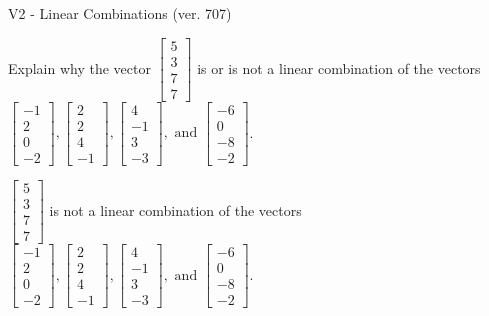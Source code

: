 \begin{exercise}
  \begin{exerciseTitle}V2 - Linear Combinations (ver. 707)\end{exerciseTitle}
  \begin{exerciseStatement}
    Explain why the vector \(\left[\begin{array}{c}
5 \\
3 \\
7 \\
7
\end{array}\right]\)  is or is not a linear 
	combination of the vectors \(\left[\begin{array}{c}
-1 \\
2 \\
0 \\
-2
\end{array}\right] , \left[\begin{array}{c}
2 \\
2 \\
4 \\
-1
\end{array}\right] , \left[\begin{array}{c}
4 \\
-1 \\
3 \\
-3
\end{array}\right] , \text{ and } \left[\begin{array}{c}
-6 \\
0 \\
-8 \\
-2
\end{array}\right]\).
	


  \end{exerciseStatement}
  \begin{exerciseAnswer}
   \(\left[\begin{array}{c}
5 \\
3 \\
7 \\
7
\end{array}\right]\) 
  	 is not  
	a linear combination of the vectors \(\left[\begin{array}{c}
-1 \\
2 \\
0 \\
-2
\end{array}\right] , \left[\begin{array}{c}
2 \\
2 \\
4 \\
-1
\end{array}\right] , \left[\begin{array}{c}
4 \\
-1 \\
3 \\
-3
\end{array}\right] , \text{ and } \left[\begin{array}{c}
-6 \\
0 \\
-8 \\
-2
\end{array}\right]\).


\end{exerciseAnswer}
\end{exercise}
